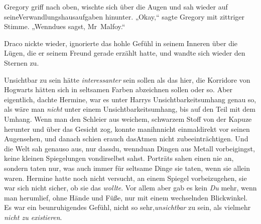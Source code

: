 Gregory griff nach oben, wischte sich über die Augen und sah wieder auf seineVerwandlungshausaufgaben hinunter. „Okay,“ sagte Gregory mit zittriger Stimme. „Wenndues sagst, Mr~Malfoy.“

Draco nickte wieder, ignorierte das hohle Gefühl in seinem Inneren über die Lügen, die er seinem Freund gerade erzählt hatte, und wandte sich wieder den Sternen zu.


Unsichtbar zu sein hätte \emph{interessanter} sein sollen als das hier, die Korridore von Hogwarts hätten sich in seltsamen Farben abzeichnen sollen oder so. Aber eigentlich, dachte Hermine, war es unter Harrys Unsichtbarkeitsumhang genau so, als wäre man \emph{nicht} unter einem Unsichtbarkeitsumhang, bis auf den Teil mit dem Umhang. Wenn man den Schleier aus weichem, schwarzem Stoff von der Kapuze herunter und über das Gesicht zog, konnte manihnnicht einmaldirekt vor seinen Augensehen, und danach schien erauch dasAtmen nicht zubeeinträchtigen. Und die Welt sah genauso aus, nur dassdu, wennduan Dingen aus Metall vorbeigingst, keine kleinen Spiegelungen vondirselbst sahst. Porträts sahen einen nie an, sondern taten nur, was auch immer für seltsame Dinge sie taten, wenn sie allein waren. Hermine hatte noch nicht versucht, an einem Spiegel vorbeizugehen, sie war sich nicht sicher, ob sie das \emph{wollte}. Vor allem aber gab es kein \emph{Du} mehr, wenn man herumlief, ohne Hände und Füße, nur mit einem wechselnden Blickwinkel. Es war ein beunruhigendes Gefühl, nicht so sehr,\emph{unsichtbar} zu sein, als vielmehr \emph{nicht zu existieren}.

